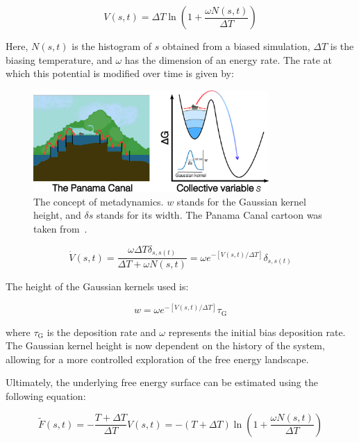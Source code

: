 \begin{equation}
    V(s, t) = \Delta T \ln\left(1 + \frac{\omega N(s, t)}{\Delta T}\right)
    \label{eq:history_dependant_potential}
\end{equation}

Here, $N(s, t)$ is the histogram of $s$ obtained from a biased simulation, $\Delta T$ is the biasing temperature, and $\omega$ has the dimension of an energy rate. The rate at which this potential is modified over time is given by:

\begin{figure}[t!]
    \centering
    \includegraphics[width=0.8\textwidth]{Figures/2_Theory/theory_metadynamics.png}
    \caption{The concept of metadynamics. $w$ stands for the Gaussian kernel height, and $\delta s$ stands for its width. The Panama Canal cartoon was taken from~\citep{HowPanamaCanal}.}
    \label{fig:metadynamics}
\end{figure}

\begin{equation}
    \dot{V}(s,t) = \frac{\omega \Delta T \delta_{s,s(t)}}{\Delta T + \omega N(s,t)} 
    = \omega e^{-[V(s,t)/\Delta T]} \delta_{s,s(t)}
    \label{eq:hill_deposition_rate}
\end{equation}

The height of the Gaussian kernels used is:

\begin{equation}
    w = \omega e^{-[V(s,t)/\Delta T]} \tau_{\text{G}}
    \label{eq:hill_height}
\end{equation}

where $\tau_{\text{G}}$ is the deposition rate and $\omega$ represents the initial bias deposition rate. The Gaussian kernel height is now dependent on the history of the system, allowing for a more controlled exploration of the free energy landscape.

Ultimately, the underlying free energy surface can be estimated using the following equation:

\begin{equation}
    \tilde{F}(s,t) = -\frac{T + \Delta T}{\Delta T} V(s,t) 
    = -(T + \Delta T) \ln\left(1 + \frac{\omega N(s,t)}{\Delta T} \right)
    \label{eq:free_energy_surface_reconstruction}
\end{equation}

